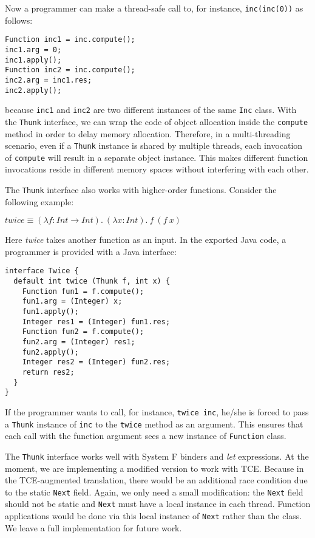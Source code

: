 \noindent Now a programmer can make a thread-safe call to, for
instance, \lstinline{inc(inc(0))} as follows:

\begin{lstlisting}
Function inc1 = inc.compute();
inc1.arg = 0;
inc1.apply();
Function inc2 = inc.compute();
inc2.arg = inc1.res;
inc2.apply();
\end{lstlisting}

\noindent because \lstinline{inc1} and \lstinline{inc2} are two
different instances of the same \lstinline{Inc} class. With the
\lstinline{Thunk} interface, we can wrap the code of object allocation
inside the \lstinline{compute} method in order to delay memory allocation.
Therefore, in a multi-threading scenario, even if a
\lstinline{Thunk} instance is shared by multiple threads, each
invocation of \lstinline{compute} will result in a separate object instance.
This makes different function invocations reside
in different memory spaces without interfering with each other.

The \lstinline{Thunk} interface also works with higher-order
functions. Consider the following example:

\vspace{5pt}
$twice \equiv (\lambda f : Int \rightarrow Int) .~(\lambda x : Int) .~f~(f~x)$
\vspace{5pt}

\noindent Here \emph{twice} takes another function as an input. In the
exported Java code, a programmer is provided with a Java interface:

\begin{lstlisting}
interface Twice {
  default int twice (Thunk f, int x) {
    Function fun1 = f.compute();
    fun1.arg = (Integer) x;
    fun1.apply();
    Integer res1 = (Integer) fun1.res;
    Function fun2 = f.compute();
    fun2.arg = (Integer) res1;
    fun2.apply();
    Integer res2 = (Integer) fun2.res;
    return res2;
  }
}
\end{lstlisting}

\noindent If the programmer wants to call, for instance,
\lstinline{twice inc}, he/she is forced to pass a \lstinline{Thunk}
instance of \lstinline{inc} to the \lstinline{twice} method as an
argument. This ensures that each call with the function argument
sees a new instance of \lstinline{Function} class.

The \lstinline{Thunk} interface works well with System F binders
and \emph{let} expressions. At the moment, we are implementing a
modified version to work with TCE. Because in the TCE-augmented
translation, there would be an additional race condition due to the
static \lstinline{Next} field. Again, we only need a small
modification: the \lstinline{Next} field should not be static and
\lstinline{Next} must have a local instance in each thread. Function
applications would be done via this local instance of \lstinline{Next}
rather than the class. We leave a full implementation for future work.


